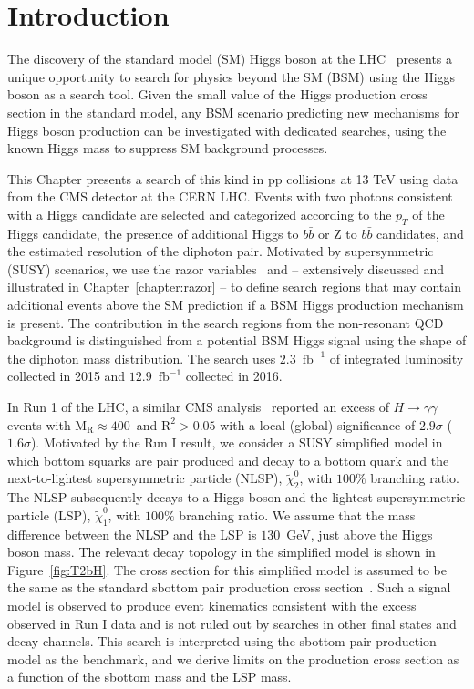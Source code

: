 \section{Introduction}\label{sec:intro}
The discovery of the standard model (SM) Higgs boson at the LHC~\cite{ATLAShiggs,CMShiggs} 
presents a unique opportunity to search for physics beyond the SM (BSM) using the Higgs boson as a search
tool. Given the small value of the Higgs production cross section in the standard model, 
any BSM scenario predicting new mechanisms for Higgs boson production can be investigated 
with dedicated searches, using the known Higgs mass to suppress SM background processes.


This Chapter presents a search of this kind in pp collisions at 13 TeV using data from the CMS detector at the CERN LHC.
Events with two photons consistent with a Higgs candidate are selected and categorized
according to the $p_{T}$ of the Higgs candidate, the presence of additional 
Higgs to $b\bar{b}$ or Z to $b\bar{b}$ candidates, and the estimated resolution of the diphoton
pair. Motivated by supersymmetric (SUSY) scenarios, we use the razor variables~\cite{razor2010, rogan}
\MR and \Rtwo  -- extensively discussed and illustrated in
Chapter~\ref{chapter:razor} -- to define search regions that may contain additional events above the SM prediction
if a BSM Higgs production mechanism is present.  
The contribution in the search regions from the non-resonant QCD background is distinguished from a potential BSM 
Higgs signal using the shape of the diphoton mass distribution. The search uses $2.3$~$\mathrm{fb}^{-1}$ of 
integrated luminosity collected in 2015 and $12.9$~$\mathrm{fb}^{-1}$ collected in 2016. 


In Run 1 of the LHC, a similar CMS analysis~\cite{SUS-14-017} reported an excess of $H \to \gamma \gamma$ 
events with $\mathrm{M_R}\approx 400$~\GeV and $\mathrm{R^2}>0.05$ with a local (global) significance of
$2.9\sigma$ ($1.6\sigma$). Motivated by the Run I result, we consider a
SUSY simplified model in which bottom squarks are pair produced and decay
to a bottom quark and the next-to-lightest supersymmetric particle (NLSP), 
$\tilde{\chi}^{0}_{2}$, with $100\%$ branching ratio.
The NLSP subsequently decays to a Higgs boson and the lightest 
supersymmetric particle (LSP), $\tilde{\chi}^{0}_{1}$, with $100\%$ branching ratio. 
We assume that the mass difference between the NLSP and the LSP is $130$~GeV,
just above the Higgs boson mass.
The relevant decay topology in the simplified model is shown in Figure~\ref{fig:T2bH}. 
The cross section for this simplified model is assumed to be the same
as the standard sbottom pair production cross section~\cite{Borschensky:2014cia}.
Such a signal model is observed to produce event kinematics consistent with the
excess observed in Run I data and is not ruled out by searches in
other final states and decay channels. This search is interpreted using
the sbottom pair production model as the benchmark, and we derive limits 
on the production cross section as a function of the sbottom mass and the
LSP mass.



